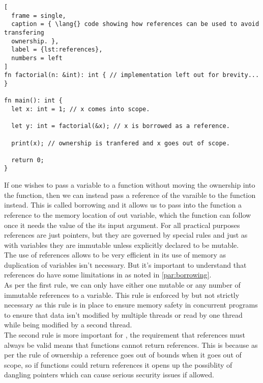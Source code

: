 \newpage

\begin{lstlisting}[
  frame = single,
  caption = { \lang{} code showing how references can be used to avoid transfering
  ownership. }, 
  label = {lst:references},
  numbers = left
]
fn factorial(n: &int): int { // implementation left out for brevity... }

fn main(): int {
  let x: int = 1; // x comes into scope.

  let y: int = factorial(&x); // x is borrowed as a reference.

  print(x); // ownership is tranfered and x goes out of scope.

  return 0;
}
\end{lstlisting}

If one wishes to pass a variable to a function without moving the ownership into the
function, then we can instead pass a reference of the varaible to the function instead. This is
called borrowing and it allows us to pass into the function a reference to the
memory location of out variable, which the function can follow once it needs the value
of the its input argument. For all practical purposes references are just pointers, but they
are governed by special rules and just as with variables they are immutable unless
explicitly declared to be mutable. \\

The use of references allows \lang{} to be very efficient in its use of memory as
duplication of variables isn't necessary. But it's important to understand that
references do have some limitations in \lang{} as noted in \ref{par:borrowing}. \\

As per the first rule, we can only have either one mutable or any number of immutable references to a
variable. This rule is enforced by \lang{} but not strictly necessary as this rule
is in place to ensure memory safety in concurrent programs to ensure that data isn't
modified by multiple threads or read by one thread while being modified by a second
thread. \\

The second rule is more important for \lang{}, the requirement that references must
always be valid means that functions cannot return references. This is because as per
the rule of ownership a reference goes out of bounds when it goes out of scope, so if
functions could return references it opens up the possiblity of dangling pointers
which can cause serious security issues if allowed.
